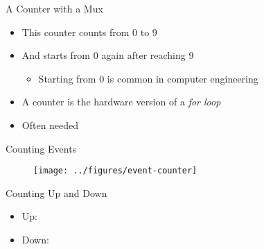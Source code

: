 \begin{frame}[fragile]{A Counter with a Mux}
\begin{itemize}
\item This counter counts from 0 to 9
\item And starts from 0 again after reaching 9
\begin{itemize}
\item Starting from 0 is common in computer engineering
\end{itemize}
\item A counter is the hardware version of a \emph{for loop}
\item Often needed
\end{itemize}
\end{frame}

\begin{frame}[fragile]{Counting Events}
\begin{figure}
  \texttt{[image: ../figures/event-counter]}
\end{figure}
\end{frame}


\begin{frame}[fragile]{Counting Up and Down}
\begin{itemize}
\item Up:
\item Down:
\end{itemize}
\end{frame}


